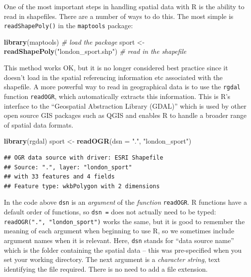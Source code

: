 \documentclass[]{article}
\newenvironment{Shaded}{}{}
\newcommand{\KeywordTok}[1]{\textcolor[rgb]{0.00,0.44,0.13}{\textbf{{#1}}}}
\newcommand{\DataTypeTok}[1]{\textcolor[rgb]{0.56,0.13,0.00}{{#1}}}
\newcommand{\StringTok}[1]{\textcolor[rgb]{0.25,0.44,0.63}{{#1}}}
\newcommand{\CommentTok}[1]{\textcolor[rgb]{0.38,0.63,0.69}{\textit{{#1}}}}
\newcommand{\NormalTok}[1]{{#1}}
\begin{document}
One of the most important steps in handling spatial data with R is the
ability to read in shapefiles. There are a number of ways to do this.
The most simple is \texttt{readShapePoly()} in the \texttt{maptools}
package:

\begin{Shaded}
\begin{Highlighting}[]
\KeywordTok{library}\NormalTok{(maptools)  }\CommentTok{# load the package}
\NormalTok{sport <- }\KeywordTok{readShapePoly}\NormalTok{(}\StringTok{"london_sport.shp"}\NormalTok{)  }\CommentTok{# read in the shapefile}
\end{Highlighting}
\end{Shaded}
This method works OK, but it is no longer considered best practice since
it doesn't load in the spatial referencing information etc associated
with the shapefile. A more powerful way to read in geographical data is
to use the \texttt{rgdal} function \texttt{readOGR}, which automatically
extracts this information. This is R's interface to the ``Geospatial
Abstraction Library (GDAL)'' which is used by other open source GIS
packages such as QGIS and enables R to handle a broader range of spatial
data formats.

\begin{Shaded}
\begin{Highlighting}[]
\KeywordTok{library}\NormalTok{(rgdal)}
\NormalTok{sport <- }\KeywordTok{readOGR}\NormalTok{(}\DataTypeTok{dsn =} \StringTok{"."}\NormalTok{, }\StringTok{"london_sport"}\NormalTok{)}
\end{Highlighting}
\end{Shaded}
\begin{verbatim}
## OGR data source with driver: ESRI Shapefile 
## Source: ".", layer: "london_sport"
## with 33 features and 4 fields
## Feature type: wkbPolygon with 2 dimensions
\end{verbatim}
In the code above \texttt{dsn} is an \emph{argument} of the
\emph{function} \texttt{readOGR}. R functions have a default order of
functions, so \texttt{dsn =} does not actually need to be typed:
\texttt{readOGR(".", "london\_sport")} works the same, but it is good to
remember the meaning of each argument when beginning to use R, so we
sometimes include argument names when it is relevant. Here, \texttt{dsn}
stands for ``data source name'' which is the folder containing the
spatial data -- this was pre-specified when you set your working
directory. The next argument is a \emph{character string}, text
identifying the file required. There is no need to add a file extension.
\end{document}
